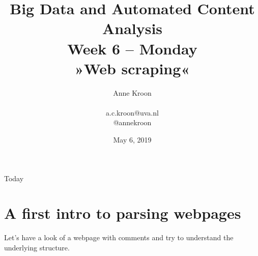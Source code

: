 \documentclass{beamer}
\begin{document}
\title[Big Data and Automated Content Analysis]{\textbf{Big Data and Automated Content Analysis} \\ Week 6 -- Monday \\ »Web scraping«}
\author[Anne Kroon]{Anne Kroon \\ ~ \\ \footnotesize{a.c.kroon@uva.nl \\@annekroon} \\}
\date{May 6, 2019}

\begin{frame}{}
\titlepage
\end{frame}

\begin{frame}{Today}
\tableofcontents
\end{frame}



\section{A first intro to parsing webpages}

\begin{frame}
Let's have a look of a webpage with comments and try to understand the underlying structure.
\end{frame}


{
\begin{frame}[plain]
\end{frame}
\begin{frame}[plain]
\end{frame}

\begin{frame}[plain]
\end{frame}
}
\end{document}
